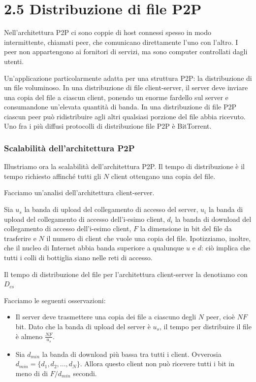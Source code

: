 \documentclass{book}
\begin{document}
\section*{2.5 Distribuzione di file P2P}
Nell'architettura P2P ci sono coppie di host connessi spesso in modo intermittente, chiamati peer, che comunicano direttamente l'uno con l'altro. I peer non appartengono ai fornitori di servizi, ma sono computer controllati dagli utenti.

Un'applicazione particolarmente adatta per una struttura P2P: la distribuzione di un file voluminoso. In una distribuzione di file client-server, il server deve inviare una copia del file a ciascun client, ponendo un enorme fardello sul server e consumandone un'elevata quantità di banda. In una distribuzione di file P2P ciascun peer può ridistribuire agli altri qualsiasi porzione del file abbia ricevuto. Uno fra i più diffusi protocolli di distribuzione file P2P è BitTorrent.

\subsubsection*{Scalabilità dell'architettura P2P}
Illustriamo ora la scalabilità dell'architettura P2P. Il tempo di distribuzione è il tempo richiesto affinché tutti gli $N$ client ottengano una copia del file.

Facciamo un'analisi dell'architettura client-server.

Sia $u_{s}$ la banda di upload del collegamento di accesso del server, $u_{i}$ la banda di upload del collegamento di accesso dell'i-esimo client, $d_{i}$ la banda di download del collegamento di accesso dell'i-esimo client, $F$ la dimensione in bit del file da trasferire e $N$ il numero di client che vuole una copia del file. Ipotizziamo, inoltre, che il nucleo di Internet abbia banda superiore a qualunque $u$ e $d$: ciò implica che tutti i colli di bottiglia siano nelle reti di accesso.

Il tempo di distribuzione del file per l'architettura client-server la denotiamo con $D_{cs}$

Facciamo le seguenti osservazioni:

\begin{itemize}
	\item Il server deve trasmettere una copia dei file a ciascuno degli $N$ peer, cioè $NF$ bit. Dato che la banda di upload del server è $u_{s}$, il tempo per distribuire il file è almeno $\frac{NF}{u_{s}}$.
	\item Sia $d_{min}$ la banda di download più bassa tra tutti i client. Ovverosia $d_{min} = \{d_{1}, d_{2}, ..., d_{N}\}$. Allora questo client non può ricevere tutti i bit in meno di di $F/d_{min}$ secondi.
\end{itemize}
\end{document}
